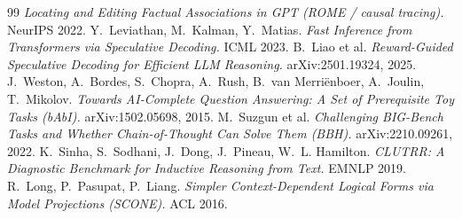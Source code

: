 \documentclass[11pt]{article}
\begin{document}
\begin{thebibliography}{99}
\emph{Locating and Editing Factual Associations in GPT (ROME / causal tracing).} NeurIPS 2022.
 Y.~Leviathan, M.~Kalman, Y.~Matias.
\emph{Fast Inference from Transformers via Speculative Decoding.} ICML 2023.
 B.~Liao et al.
\emph{Reward-Guided Speculative Decoding for Efficient LLM Reasoning.} arXiv:2501.19324, 2025.
 J.~Weston, A.~Bordes, S.~Chopra, A.~Rush, B.~van Merri\"enboer, A.~Joulin, T.~Mikolov.
\emph{Towards AI-Complete Question Answering: A Set of Prerequisite Toy Tasks (bAbI).} arXiv:1502.05698, 2015.
 M.~Suzgun et al.
\emph{Challenging BIG-Bench Tasks and Whether Chain-of-Thought Can Solve Them (BBH).} arXiv:2210.09261, 2022.
 K.~Sinha, S.~Sodhani, J.~Dong, J.~Pineau, W.~L. Hamilton.
\emph{CLUTRR: A Diagnostic Benchmark for Inductive Reasoning from Text.} EMNLP 2019.
 R.~Long, P.~Pasupat, P.~Liang.
\emph{Simpler Context-Dependent Logical Forms via Model Projections (SCONE).} ACL 2016.
\end{thebibliography}
\end{document}
